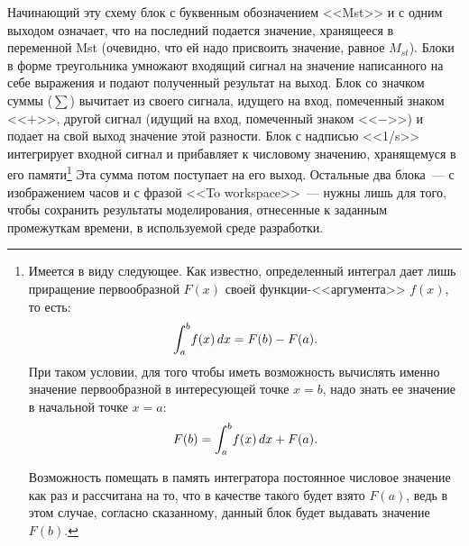 \documentclass[12pt,a4paper,openany]{extarticle}
\begin{document}
Начинающий эту схему блок с буквенным обозначением <<Mst>> и с одним выходом означает, что на последний подается значение, хранящееся в переменной Mst (очевидно, что ей надо присвоить значение, равное $M_{st}$). 
Блоки в форме треугольника умножают входящий сигнал на значение написанного на себе выражения и подают полученный результат на выход. 
Блок со значком суммы ($\sum$) вычитает из своего сигнала, идущего на вход, помеченный знаком <<$+$>>, другой сигнал (идущий на вход, помеченный знаком <<$-$>>) и подает на свой выход значение этой разности.
Блок с надписью <<1/s>> интегрирует входной сигнал и прибавляет к числовому значению, хранящемуся в его памяти\footnote{Имеется в виду следующее. Как известно, определенный интеграл дает лишь приращение первообразной $F(x)$ своей функции-<<аргумента>> $f(x)$, то есть:
\begin{equation}
	\int_a^b\! f(x)\,dx = F(b) - F(a)\ldotp
\end{equation}
При таком условии, для того чтобы иметь возможность вычислять именно значение первообразной в интересующей точке $x = b$, надо знать ее значение в начальной точке $x = a$:
\begin{equation}
	F(b) = \int_a^b\! f(x)\,dx + F(a)\ldotp
\end{equation}

Возможность помещать в память интегратора постоянное числовое значение как раз и рассчитана на то, что в качестве такого будет взято $F(a)$, ведь в этом случае, согласно сказанному, данный блок будет выдавать значение $F(b)$.}
Эта сумма потом поступает на его выход.
Остальные два блока~--- с изображением часов и с фразой <<To workspace>>~--- нужны лишь для того, чтобы сохранить результаты моделирования, отнесенные к заданным промежуткам времени, в используемой среде разработки.
\end{document}
